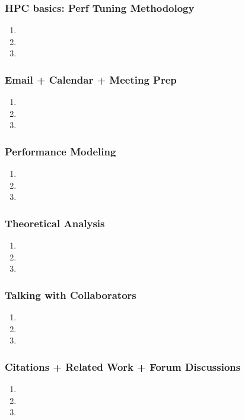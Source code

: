 \begin{frame}
\frametitle{HPC basics: Perf Tuning Methodology}
\begin{enumerate}
\item 
\item 
\item 
\end{enumerate}
\end{frame}

\begin{frame}
\frametitle{Email + Calendar + Meeting Prep}
\begin{enumerate}
\item 
\item 
\item 
\end{enumerate}
\end{frame}

\begin{frame}
\frametitle{Performance Modeling}
\begin{enumerate}
\item 
\item 
\item 
\end{enumerate}
\end{frame}

\begin{frame}
\frametitle{Theoretical Analysis}
\begin{enumerate}
\item 
\item 
\item 
\end{enumerate}
\end{frame}

\begin{frame}
\frametitle{Talking with Collaborators}
\begin{enumerate}
\item 
\item 
\item 
\end{enumerate}
\end{frame}

\begin{frame}
\frametitle{Citations + Related Work + Forum Discussions}
\begin{enumerate}
\item 
\item 
\item 
\end{enumerate}
\end{frame}


